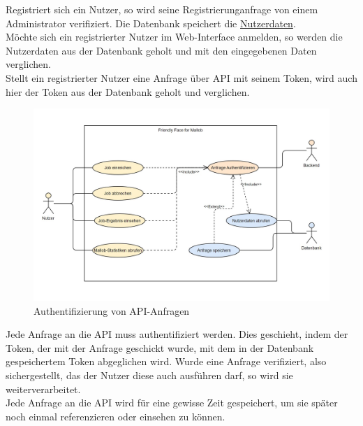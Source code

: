 Registriert sich ein \gls{Nutzer}, so wird seine Registrierunganfrage von einem \gls{Administrator} verifiziert. Die \gls{Datenbank} speichert die \hyperref[PD:Nutzerdaten]{Nutzerdaten}.\\
Möchte sich ein registrierter \gls{Nutzer} im Web-Interface anmelden, so werden die Nutzerdaten aus der \gls{Datenbank} geholt und mit den eingegebenen Daten verglichen. \\
Stellt ein registrierter \gls{Nutzer} eine Anfrage über \gls{API} mit seinem \gls{Token}, wird auch hier der \gls{Token} aus der \gls{Datenbank} geholt und verglichen.
\begin{figure}[H]
    \centering
    \includegraphics[width=\textwidth]{images-interface/Diagramme/Request_authntification_screenshot.jpg}
    \caption{Authentifizierung von \gls{API}-Anfragen}
\end{figure}
Jede Anfrage an die \gls{API} muss authentifiziert werden. Dies geschieht, indem der \gls{Token}, der mit der Anfrage geschickt wurde, mit dem in der \gls{Datenbank} gespeichertem \gls{Token} abgeglichen wird. Wurde eine Anfrage verifiziert, also sichergestellt, das der \gls{Nutzer} diese auch ausführen darf, so wird sie weiterverarbeitet.\\
Jede Anfrage an die \gls{API} wird für eine gewisse Zeit gespeichert, um sie später noch einmal referenzieren oder einsehen zu können.

\pagebreak

